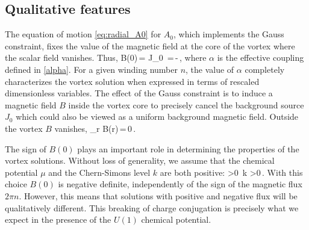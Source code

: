 \subsection{Qualitative features}
The equation of motion \eqref{eq:radial_A0} for $A_0$, which implements the Gauss constraint, fixes the value of the magnetic field at the core of the vortex where the scalar field vanishes. Thus,
\be
B(0)\,=\,\,J_0
\,=\,-\,,
\ee
where $\alpha$ is the effective coupling defined in \eqref{alpha}. For a given winding number $n$, the value of $\alpha$ completely characterizes the vortex solution when expressed in terms of rescaled dimensionless variables.
The effect of the Gauss constraint is to induce a magnetic field $B$ inside the vortex core to precisely cancel the background source $J_0$ which could also  be viewed as a uniform background magnetic field.  Outside the vortex $B$ vanishes,
\be
\lim_{r\to\infty} B(r)\,=\,0\,.
\ee

The sign of $B(0)$ plays an important role in determining the properties of the vortex solutions. Without loss of generality, we assume that the chemical potential $\mu$ and the Chern-Simons level $k$ are both positive:
\be
\mu >0\, \qquad \qquad k >0\,.
\ee
With this choice $B(0)$ is negative definite,   independently of the sign of the magnetic flux $2\pi n$. However, this means that solutions with positive and negative flux will be qualitatively different. This breaking of charge conjugation is precisely what we expect in the presence of the $U(1)$ chemical potential.

